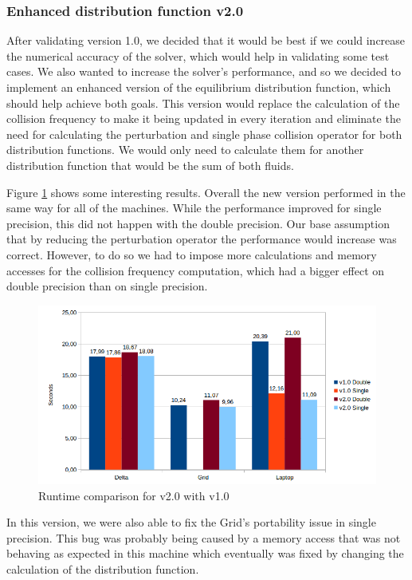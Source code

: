 \documentclass[12pt]{book}
\begin{document}
\subsubsection{Enhanced distribution function v2.0}
After validating version 1.0, we decided that it would be best if we could increase the numerical accuracy of the solver, which would help in validating some test cases. We also wanted to increase the solver's performance, and so we decided to implement an enhanced version of the equilibrium distribution function, which should help achieve both goals. This version would replace the calculation of the collision frequency to make it being updated in every iteration and eliminate the need for calculating the perturbation and single phase collision operator for both distribution functions. We would only need to calculate them for another distribution function that would be the sum of both fluids.\par
  Figure \ref{fig:v2} shows some interesting results. Overall the new version performed in the same way for all of the machines. While the performance improved for single precision, this did not happen with the double precision. Our base assumption that by reducing the perturbation operator the performance would increase was correct. However, to do so we had to impose more calculations and memory accesses for the collision frequency computation, which had a bigger effect on double precision than on single precision. 

  \begin{figure}[H]
  	\centering
  	\includegraphics[width=\linewidth]{Resources/Images/v2.png}
  	\caption{Runtime comparison for v2.0 with v1.0}
  	\label{fig:v2}
  \end{figure}
  

  In this version, we were also able to fix the Grid's portability issue in single precision. This bug was probably being caused by a memory access that was not behaving as expected in this machine which eventually was fixed by changing the calculation of the distribution function.
\end{document}
